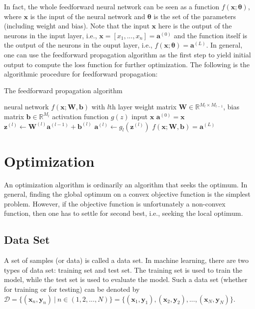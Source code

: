 \documentclass[
	parskip, 			   %
	twoside, 			   %
	DIV=14, 			   %
	BCOR=15.0mm, 		   %
	headsepline, 		   %
	open=right, 		   %
	captions=tableheading, %
	bibliography=totoc,    %
	numbers=noenddot       %
]{scrreprt}
\begin{document}
In fact, the whole feedforward neural network can be seen as a function $f(\mathbf{x};\mathbf{\theta})$, where $\mathbf{x}$ is the input of the neural network and $\mathbf{\theta}$ is the set of the parameters (including weight and bias). Note that the input $\mathbf{x}$ here is the output of the neurons in the input layer, i.e., $\mathbf{x}=[x_1, ..., x_n]=\mathbf{a}^{(0)}$ and the function itself is the output of the neurons in the ouput layer, i.e., $f(\mathbf{x};\mathbf{\theta})=\mathbf{a}^{(L)}$. In general, one can use the feedforward propagation algorithm as the first step to yield initial output to compute the loss function for further optimization. The following is the algorithmic procedure for feedforward propagation:


\clearpage
\begin{algorithm}[h!]
\caption{The feedforward propagation algorithm}
\label{alg:feedforward_alg}
    \begin{algorithmic}
    \Require neural network $f(\mathbf{x};\mathbf{W},\mathbf{b})$ with $l$th layer
    \Require weight matrix $\mathbf{W} \in \mathbb{R}^{M_{l} \times M_{l-1}}$, bias matrix $\mathbf{b} \in \mathbb{R}^{M_{l}}$
    \Require activation function $g(z)$
    \Require input $\mathbf{x}$
    \State $\mathbf{a}^{(0)}=\mathbf{x}$ 
            \State $\mathbf{z}^{(l)} \gets \mathbf{W}^{(l)} \mathbf{a}^{(l-1)} + \mathbf{b}^{(l)}$ 
            \State $\mathbf{a}^{(l)} \gets g_{l}(\mathbf{z}^{(l)})$  
            \State {}
        \EndFor
    \EndFor
    \State \Return $f(\mathbf{x};\mathbf{W},\mathbf{b})=\mathbf{a}^{(L)}$ 
    \end{algorithmic}
\end{algorithm}

\section{Optimization}
An optimization algorithm is ordinarily an algorithm that seeks the optimum. In general, finding the global optimum on a convex objective function is the simplest problem. However, if the objective function is unfortunately a non-convex function, then one has to settle for second best, i.e., seeking the local optimum.

\subsection{Data Set}
A set of samples (or data) is called a data set. In machine learning, there are two types of data set: training set and test set. The training set is used to train the model, while the test set is used to evaluate the model. Such a data set (whether for training or for testing) can be denoted by $\mathcal{D}=\{ (\mathbf{x}_{n}, \mathbf{y}_{n})  \: \vert \:  n \in (1, 2, ..., N)  \} = \{ (\mathbf{x}_{1}, \mathbf{y}_{1}),  (\mathbf{x}_{2}, \mathbf{y}_{2}), ..., (\mathbf{x}_{N}, \mathbf{y}_{N}) \}$.
\end{document}
